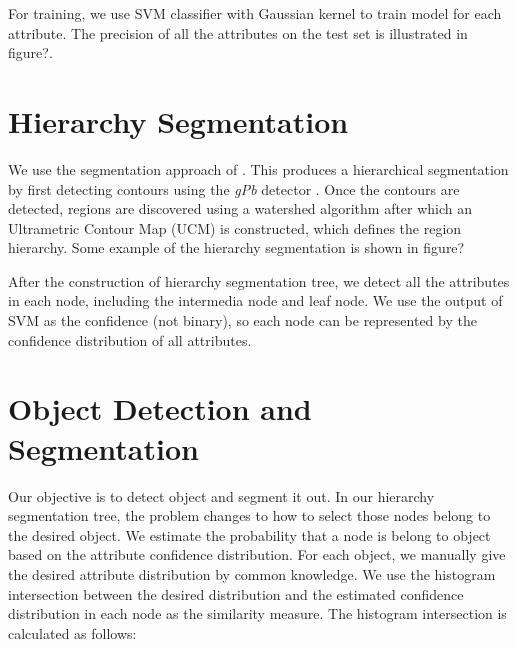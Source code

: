 \documentclass[10pt,twocolumn,letterpaper]{article}
\begin{document}
For training, we use SVM classifier with Gaussian kernel to train model for each attribute. The precision of all the attributes on the test set is illustrated in figure?.



\section{Hierarchy Segmentation}
\label{sec:segmentation}

We use the segmentation
approach of \cite{arbelaez09}.  This produces a hierarchical
segmentation by first detecting contours using the \emph{gPb} detector
\cite{maire08}.  Once the contours are detected, regions are discovered using a
watershed algorithm after which an Ultrametric Contour Map (UCM) is constructed,
which defines the region hierarchy. Some example of the hierarchy segmentation is shown in figure?

After the construction of hierarchy segmentation tree, we detect all the attributes in each node, including the intermedia node and leaf node. We use the output of SVM as the confidence (not binary), so each node can be represented by the confidence distribution of all attributes.


\section{Object Detection and Segmentation}
\label{sec:detection}

Our objective is to detect object and segment it out. In our hierarchy segmentation tree, the problem changes to how to select those nodes belong to the desired object. We estimate the probability that a node is belong to object based on the attribute confidence distribution. For each object, we manually give the desired attribute distribution by common knowledge. We use the histogram intersection between the desired distribution and the estimated confidence distribution in each node as the similarity measure. The histogram intersection is calculated as follows:
 
\end{document}
